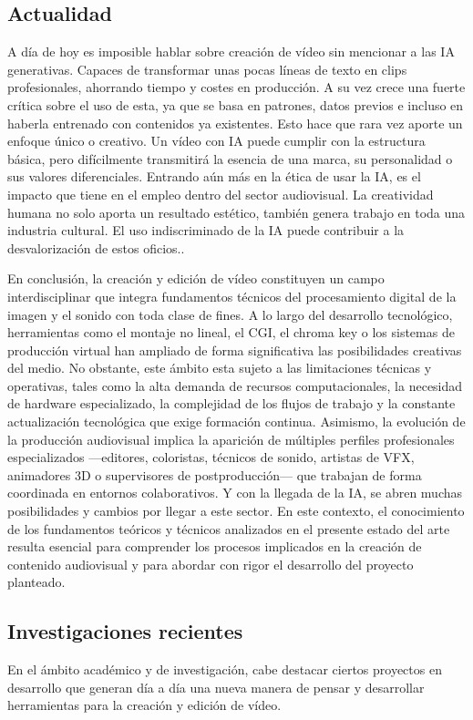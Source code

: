 \subsection{Actualidad}
A día de hoy es imposible hablar sobre creación de vídeo sin mencionar a las IA generativas. Capaces de transformar unas pocas líneas de texto en clips profesionales, ahorrando tiempo y costes en producción. A su vez crece una fuerte crítica sobre el uso de esta, ya que se basa en patrones, datos previos e incluso en haberla entrenado con contenidos ya existentes. Esto hace que rara vez aporte un enfoque único o creativo. Un vídeo con IA puede cumplir con la estructura básica, pero difícilmente transmitirá la esencia de una marca, su personalidad o sus valores diferenciales. Entrando aún más en la ética de usar la IA, es el impacto que tiene en el empleo dentro del sector audiovisual. La creatividad humana no solo aporta un resultado estético, también genera trabajo en toda una industria cultural. El uso indiscriminado de la IA puede contribuir a la desvalorización de estos oficios.\cite{ia_video}.

En conclusión, la creación y edición de vídeo constituyen un campo interdisciplinar que integra fundamentos técnicos del procesamiento digital de la imagen y el sonido con toda clase de fines. A lo largo del desarrollo tecnológico, herramientas como el montaje no lineal, el CGI, el chroma key o los sistemas de producción virtual han ampliado de forma significativa las posibilidades creativas del medio. No obstante, este ámbito esta sujeto a las limitaciones técnicas y operativas, tales como la alta demanda de recursos computacionales, la necesidad de hardware especializado, la complejidad de los flujos de trabajo y la constante actualización tecnológica que exige formación continua. Asimismo, la evolución de la producción audiovisual implica la aparición de múltiples perfiles profesionales especializados —editores, coloristas, técnicos de sonido, artistas de VFX, animadores 3D o supervisores de postproducción— que trabajan de forma coordinada en entornos colaborativos. Y con la llegada de la IA, se abren muchas posibilidades y cambios por llegar a este sector. En este contexto, el conocimiento de los fundamentos teóricos y técnicos analizados en el presente estado del arte resulta esencial para comprender los procesos implicados en la creación de contenido audiovisual y para abordar con rigor el desarrollo del proyecto planteado.

\subsection{Investigaciones recientes}
En el ámbito académico y de investigación, cabe destacar ciertos proyectos en desarrollo que 
generan día a día una nueva manera de pensar y desarrollar herramientas para la creación y edición 
de vídeo.

